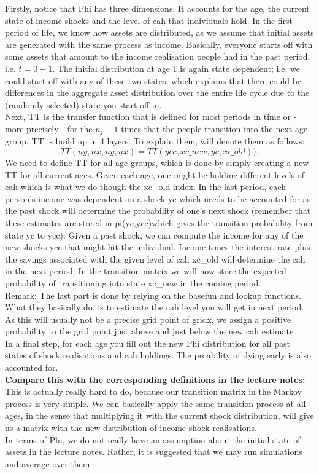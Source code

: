 \documentclass[12pt,a4paper]{article}
\begin{document}
Firstly, notice that Phi has three dimensions: It accounts for the age, the current state of income shocks and the level of cah that individuals hold. In the first period of life, we know how assets are distributed, as we assume that initial assets are generated with the same process as income. Basically, everyone starts off with some assets that amount to the income realisation people had in the past period, i.e. $t=0-1$. The initial distribution at age 1 is again state dependent; i.e. we could start off with any of these two states; which explains that there could be differences in the aggregate asset distribution over the entire life cycle due to the (randomly selected) state you start off in. 
\\
Next, TT is the transfer function that is defined for most periods in time or - more precisely - for the $n_j-1$ times that the people transition into the next age group. TT is build up in 4 layers. To explain them,  will denote them as follows: $$TT(ny,nx,ny,nx)=TT(ycc, xc\_new,yc,xc\_old)).$$
We need to define TT for all age groups, which is done by simply creating a new TT for all current ages. Given each age, one might be holding different levels of cah which is what we do though the xc\_old index. In the last period, each person's income was dependent on a shock yc which needs to be accounted for as the past shock will determine the probability of one's next shock (remember that these estimates are stored in pi(yc,ycc)which gives the transition probability from state yc to ycc). Given a past shock, we can compute the income for any of the new shocks ycc that might hit the individual. Income times the interest rate plus the savings associated with the given level of cah xc\_old will determine the cah in the next period. In the transition matrix we will now store the expected probability of transitioning into state xc\_new in the coming period. 
\\
Remark: The last part is done by relying on the basefun and lookup functions. What they basically do, is to estimate the cah level you will get in next period. As this will usually not be a precise grid point of gridx, we assign a positive probability to the grid point just above and just below the new cah estimate.
\\
In a final step, for each age you fill out the new Phi distribution for all past states of shock realisations and cah holdings. The proability of dying early is also accounted for.\\

\textbf{Compare this with the corresponding definitions in the lecture notes:} \\
This is actually really hard to do, because our transition matrix in the Markov process is very simple. We can basically apply the same transition process at all ages, in the sense that multiplying it with the current shock distribution, will give us a matrix with the new distribution of income shock realisations.
\\
In terms of Phi, we do not really have an assumption about the initial state of assets in the lecture notes. Rather, it is suggested that we may run simulations and average over them.
\\
\end{document}

